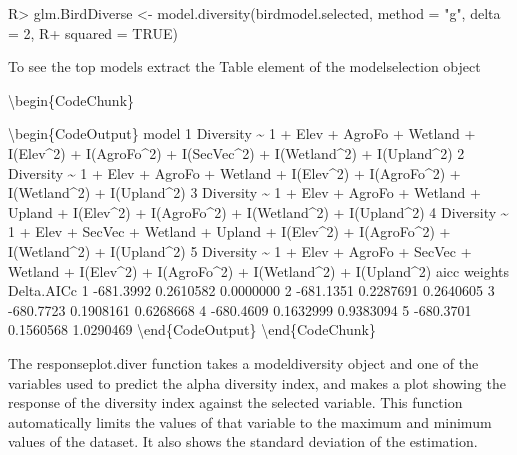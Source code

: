 \documentclass[article]{jss}
\begin{document}
\begin{CodeChunk}

\begin{CodeInput}
R> glm.BirdDiverse <- model.diversity(birdmodel.selected, method = "g", delta = 2, 
R+ squared = TRUE)
\end{CodeInput}
\end{CodeChunk}

To see the top models extract the Table element of the modelselection
object

\textbackslash{}begin\{CodeChunk\}

\textbackslash{}begin\{CodeOutput\} model 1 Diversity \textasciitilde{}
1 + Elev + AgroFo + Wetland + I(Elev\^{}2) + I(AgroFo\^{}2) +
I(SecVec\^{}2) + I(Wetland\^{}2) + I(Upland\^{}2) 2 Diversity
\textasciitilde{} 1 + Elev + AgroFo + Wetland + I(Elev\^{}2) +
I(AgroFo\^{}2) + I(Wetland\^{}2) + I(Upland\^{}2) 3 Diversity
\textasciitilde{} 1 + Elev + AgroFo + Wetland + Upland + I(Elev\^{}2) +
I(AgroFo\^{}2) + I(Wetland\^{}2) + I(Upland\^{}2) 4 Diversity
\textasciitilde{} 1 + Elev + SecVec + Wetland + Upland + I(Elev\^{}2) +
I(AgroFo\^{}2) + I(Wetland\^{}2) + I(Upland\^{}2) 5 Diversity
\textasciitilde{} 1 + Elev + AgroFo + SecVec + Wetland + I(Elev\^{}2) +
I(AgroFo\^{}2) + I(Wetland\^{}2) + I(Upland\^{}2) aicc weights
Delta.AICc 1 -681.3992 0.2610582 0.0000000 2 -681.1351 0.2287691
0.2640605 3 -680.7723 0.1908161 0.6268668 4 -680.4609 0.1632999
0.9383094 5 -680.3701 0.1560568 1.0290469
\textbackslash{}end\{CodeOutput\} \textbackslash{}end\{CodeChunk\}

The responseplot.diver function takes a modeldiversity object and one of
the variables used to predict the alpha diversity index, and makes a
plot showing the response of the diversity index against the selected
variable. This function automatically limits the values of that variable
to the maximum and minimum values of the dataset. It also shows the
standard deviation of the estimation.
\end{document}
